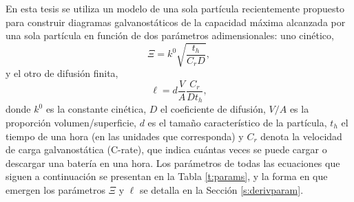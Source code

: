 En esta tesis se utiliza un modelo de una sola partícula recientemente propuesto 
\cite{gavilan2023} para construir diagramas galvanostáticos de la capacidad máxima 
alcanzada por una sola partícula en función de dos parámetros adimensionales: uno
cinético,
\begin{equation}\label{eq:xi}
    \Xi = k^0 \sqrt{\frac{t_h}{C_r D}},
\end{equation}
y el otro de difusión finita,
\begin{equation}\label{eq:ele}
    \ell = d \frac{V}{A} \frac{C_r}{D t_h},
\end{equation}
donde $k^0$ es la constante cinética, $D$ el coeficiente de difusión, $V/A$ es la 
proporción volumen/superficie, $d$ es el tamaño característico de la partícula, 
$t_h$ el tiempo de una hora (en las unidades que corresponda) y $C_r$ denota la 
velocidad de carga galvanostática (C-rate), que indica cuántas veces se puede 
cargar o descargar una batería en una hora. Los parámetros de todas las ecuaciones 
que siguen a continuación se presentan en la Tabla \ref{t:params}, y la forma en
que emergen los parámetros $\Xi$ y $\ell$ se detalla en la Sección 
\ref{s:derivparam}.
